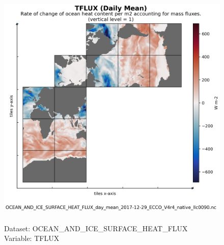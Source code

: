 \begin{figure}[H]
\centering
\includegraphics[scale=0.5]{../images/plots/native_plots/Ocean_and_Sea-Ice_Surface_Heat_Fluxes/TFLUX.png}
\caption{\\Dataset: OCEAN\_AND\_ICE\_SURFACE\_HEAT\_FLUX\\Variable: TFLUX}
\label{tab:table-OCEAN_AND_ICE_SURFACE_HEAT_FLUX_TFLUX-Plot}
\end{figure}
\pagebreak
